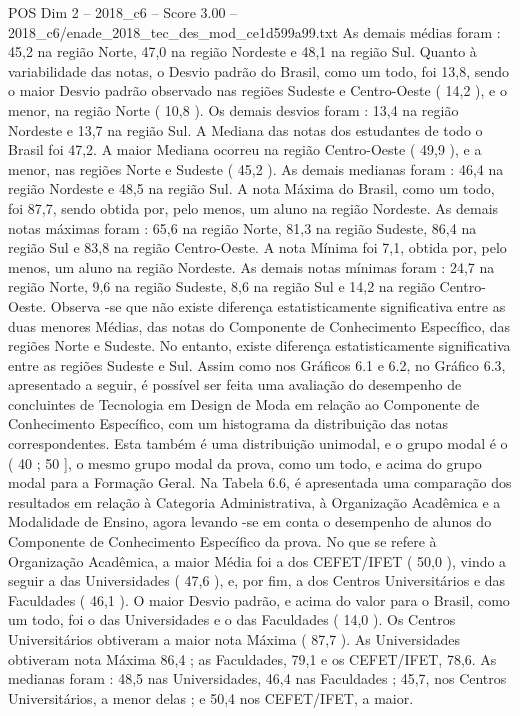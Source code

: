 \begin{textsample}{POS Dim 2 – 2018\_c6 – Score 3.00 – 2018\_c6/enade\_2018\_tec\_des\_mod\_ce1d599a99.txt}
As demais médias foram : 45,2 na região Norte, 47,0 na região Nordeste e 48,1 na região Sul.
Quanto à variabilidade das notas, o Desvio padrão do Brasil, como um todo, foi 13,8, sendo o maior Desvio padrão observado nas regiões Sudeste e Centro-Oeste ( 14,2 ), e o menor, na região Norte ( 10,8 ).
Os demais desvios foram : 13,4 na região Nordeste e 13,7 na região Sul.
A Mediana das notas dos estudantes de todo o Brasil foi 47,2.
A maior Mediana ocorreu na região Centro-Oeste ( 49,9 ), e a menor, nas regiões Norte e Sudeste ( 45,2 ).
As demais medianas foram : 46,4 na região Nordeste e 48,5 na região Sul.
A nota Máxima do Brasil, como um todo, foi 87,7, sendo obtida por, pelo menos, um aluno na região Nordeste.
As demais notas máximas foram : 65,6 na região Norte, 81,3 na região Sudeste, 86,4 na região Sul e 83,8 na região Centro-Oeste.
A nota Mínima foi 7,1, obtida por, pelo menos, um aluno na região Nordeste.
As demais notas mínimas foram : 24,7 na região Norte, 9,6 na região Sudeste, 8,6 na região Sul e 14,2 na região Centro-Oeste.
Observa -se que não existe diferença estatisticamente significativa entre as duas menores Médias, das notas do Componente de Conhecimento Específico, das regiões Norte e Sudeste.
No entanto, existe diferença estatisticamente significativa entre as regiões Sudeste e Sul.
Assim como nos Gráficos 6.1 e 6.2, no Gráfico 6.3, apresentado a seguir, é possível ser feita uma avaliação do desempenho de concluintes de Tecnologia em Design de Moda em relação ao Componente de Conhecimento Específico, com um histograma da distribuição das notas correspondentes.
Esta também é uma distribuição unimodal, e o grupo modal é o ( 40 ; 50 ], o mesmo grupo modal da prova, como um todo, e acima do grupo modal para a Formação Geral.
Na Tabela 6.6, é apresentada uma comparação dos resultados em relação à Categoria Administrativa, à Organização Acadêmica e a Modalidade de Ensino, agora levando -se em conta o desempenho de alunos do Componente de Conhecimento Específico da prova.
No que se refere à Organização Acadêmica, a maior Média foi a dos CEFET/IFET ( 50,0 ), vindo a seguir a das Universidades ( 47,6 ), e, por fim, a dos Centros Universitários e das Faculdades ( 46,1 ).
O maior Desvio padrão, e acima do valor para o Brasil, como um todo, foi o das Universidades e o das Faculdades ( 14,0 ).
Os Centros Universitários obtiveram a maior nota Máxima ( 87,7 ).
As Universidades obtiveram nota Máxima 86,4 ; as Faculdades, 79,1 e os CEFET/IFET, 78,6.
As medianas foram : 48,5 nas Universidades, 46,4 nas Faculdades ; 45,7, nos Centros Universitários, a menor delas ; e 50,4 nos CEFET/IFET, a maior.

\end{textsample}
